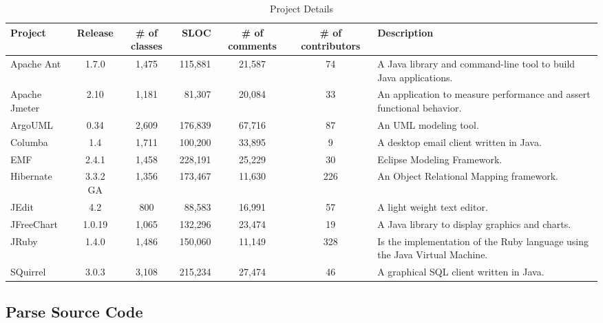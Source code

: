 \begin{table}[!tbh]
    \begin{center}
    \caption{Project Details}
    \label{tab:project_details}
            \begin{tabular}{l| c c r c c | p{2.0in}}
            \toprule
            \textbf{Project}   & \textbf{Release}  & \textbf{\# of classes}   & \textbf{SLOC}    & \textbf{\# of comments}  & \textbf{\# of contributors} & \textbf{Description}\\ \midrule 
            Apache Ant     & 1.7.0    & 1,475 & 115,881 & 21,587 & 74  & A Java library and command-line tool to build Java applications.\\
            Apache Jmeter  & 2.10     & 1,181 &  81,307 & 20,084 & 33  & An application to measure performance and assert functional behavior.\\
            ArgoUML        & 0.34     & 2,609 & 176,839 & 67,716 & 87  & An UML modeling tool.\\
            Columba        & 1.4      & 1,711 & 100,200 & 33,895 & 9   & A desktop email client written in Java.\\
            EMF            & 2.4.1    & 1,458 & 228,191 & 25,229 & 30  & Eclipse Modeling Framework.\\
            Hibernate      & 3.3.2 GA & 1,356 & 173,467 & 11,630 & 226 & An Object Relational Mapping framework.\\
            JEdit          & 4.2      &   800 &  88,583 & 16,991 & 57  & A light weight text editor.\\
            JFreeChart     & 1.0.19   & 1,065 & 132,296 & 23,474 & 19  & A Java library to display graphics and charts.\\
            JRuby          & 1.4.0    & 1,486 & 150,060 & 11,149 & 328 & Is the implementation of the Ruby language using the Java Virtual Machine.\\ 
            SQuirrel       & 3.0.3    & 3,108 & 215,234 & 27,474 & 46  & A graphical SQL client written in Java.\\ \bottomrule             
        \end{tabular}
    \end{center}
\end{table}


\subsection{Parse Source Code} %
\label{sub:parse_source_code}

